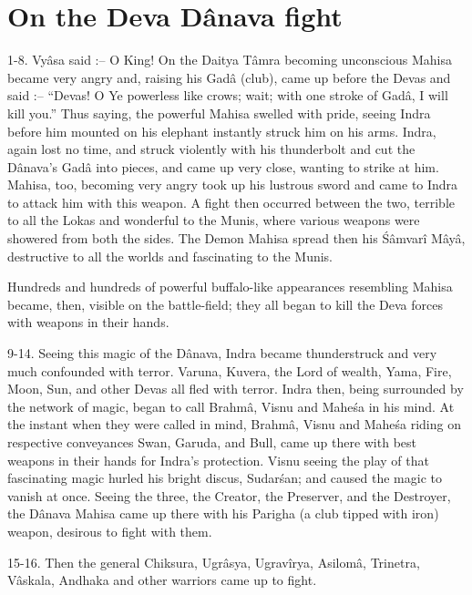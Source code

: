 ﻿\chapter{On the Deva D\^anava fight}

1-8. Vy\^asa said :-- O King! On the Daitya T\^amra becoming unconscious Mahisa became very angry and, raising his Gad\^a (club), came up before the Devas and said :-- ``Devas! O Ye powerless like crows; wait; with one stroke of Gad\^a, I will kill you.'' Thus saying, the powerful Mahisa swelled with pride, seeing Indra before him mounted on his elephant instantly struck him on his arms. Indra, again lost no time, and struck violently with his thunderbolt and cut the D\^anava's Gad\^a into pieces, and came up very close, wanting to strike at him. Mahisa, too, becoming very angry took up his lustrous sword and came to Indra to attack him with this weapon. A fight then occurred between the two, terrible to all the Lokas and wonderful to the Munis, where various weapons were showered from both the sides. The Demon Mahisa spread then his \'S\^amvar\^i M\^ay\^a, destructive to all the worlds and fascinating to the Munis.

Hundreds and hundreds of powerful buffalo-like appearances resembling Mahisa became, then, visible on the battle-field; they all began to kill the Deva forces with weapons in their hands.

9-14. Seeing this magic of the D\^anava, Indra became thunderstruck and very much confounded with terror. Varuna, Kuvera, the Lord of wealth, Yama, Fire, Moon, Sun, and other Devas all fled with terror. Indra then, being surrounded by the network of magic, began to call Brahm\^a, Visnu and Mahe\'sa in his mind. At the instant when they were called in mind, Brahm\^a, Visnu and Mahe\'sa riding on respective conveyances Swan, Garuda, and Bull, came up there with best weapons in their hands for Indra's protection. Visnu seeing the play of that fascinating magic hurled his bright discus, Sudar\'san; and caused the magic to vanish at once. Seeing the three, the Creator, the Preserver, and the Destroyer, the D\^anava Mahisa came up there with his Parigha (a club tipped with iron) weapon, desirous to fight with them.

15-16. Then the general Chiksura, Ugr\^asya, Ugrav\^irya, Asilom\^a, Trinetra, V\^askala, Andhaka and other warriors came up to fight.

